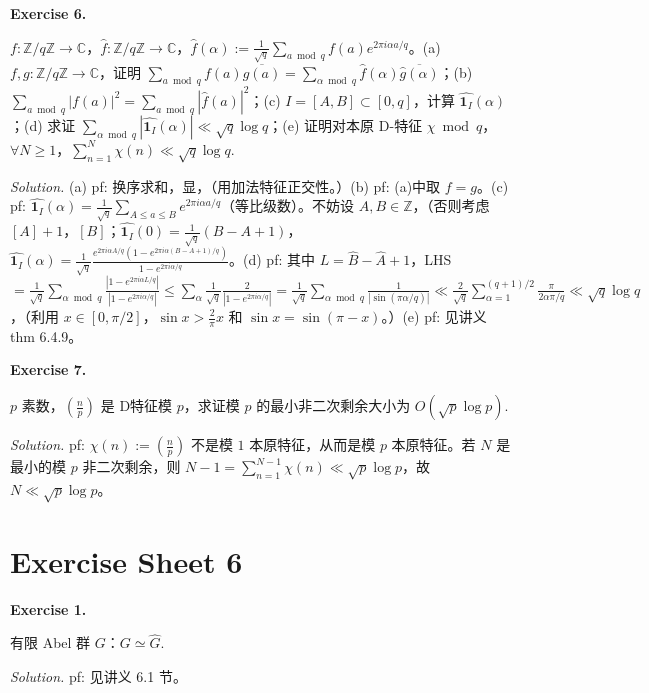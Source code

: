 \documentclass[
	colors = true,
	geometry = b5,
	fontsetup = font-setup-overleaf.tex,
	titlesetup = titles-setup.tex
]{AJbook}
\newenvironment{sheetexercise}[1]{%
	\par\medskip
	\noindent\textbf{Exercise #1.}\enspace
}{%
	\par\smallskip
}
\newenvironment{solution}{%
	\par\smallskip
	\noindent\textit{Solution.}\enspace
}{%
	\par\smallskip
}
\providecommand{\one}{\mathbf 1}
\begin{document}
\begin{sheetexercise}{6}
$f:\mathbb Z/q\mathbb Z\to\mathbb C$，$\widehat f:\mathbb Z/q\mathbb Z\to\mathbb C$，$\widehat f(\alpha):=\frac1{\sqrt q}\sum_{a\bmod q}f(a)e^{2\pi i\alpha a/q}$。(a) $f,g:\mathbb Z/q\mathbb Z\to\mathbb C$，证明 $\sum_{a\bmod q}f(a)\overline{g(a)}=\sum_{\alpha\bmod q}\widehat f(\alpha)\overline{\widehat g(\alpha)}$；(b) $\sum_{a\bmod q}|f(a)|^2=\sum_{a\bmod q}|\widehat f(a)|^2$；(c) $I=[A,B]\subset[0,q]$，计算 $\widehat{\one_I}(\alpha)$；(d) 求证 $\sum_{\alpha\bmod q}|\widehat{\one_I}(\alpha)|\ll\sqrt q\log q$；(e) 证明对本原 D-特征 $\chi\bmod q$，$\forall N\geq1$，$\sum_{n=1}^N\chi(n)\ll\sqrt q\log q$.
\end{sheetexercise}
\begin{solution}(a) pf: 换序求和，显，（用加法特征正交性。）(b) pf: (a)中取 $f=g$。(c) pf: $\widehat{\one_I}(\alpha)=\frac1{\sqrt q}\sum_{A\leq a\leq B}e^{2\pi i\alpha a/q}$（等比级数）。不妨设 $A,B\in\mathbb Z$，（否则考虑 $[A]+1$，$[B]$；$\widehat{\one_I}(0)=\frac1{\sqrt q}(B-A+1)$，$\widehat{\one_I}(\alpha)=\frac1{\sqrt q}\frac{e^{2\pi i\alpha A/q}(1-e^{2\pi i\alpha(B-A+1)/q})}{1-e^{2\pi i\alpha/q}}$。(d) pf: 其中 $L=\widehat B-\widehat A+1$，LHS$=\frac1{\sqrt q}\sum_{\alpha\bmod q}\frac{|1-e^{2\pi i\alpha L/q}|}{|1-e^{2\pi i\alpha/q}|}\leq\sum_\alpha\frac1{\sqrt q}\frac2{|1-e^{2\pi i\alpha/q}|}=\frac1{\sqrt q}\sum_{\alpha\bmod q}\frac1{|\sin(\pi\alpha/q)|}\ll\frac2{\sqrt q}\sum_{\alpha=1}^{(q+1)/2}\frac{\pi}{2\alpha\pi/q}\ll\sqrt q\log q$，（利用 $x\in[0,\pi/2]$，$\sin x>\frac2\pi x$ 和 $\sin x=\sin(\pi-x)$。）(e) pf: 见讲义 thm 6.4.9。\end{solution}

\begin{sheetexercise}{7}
$p$ 素数，$(\frac np)$ 是 D特征模 $p$，求证模 $p$ 的最小非二次剩余大小为 $O(\sqrt p\log p)$.
\end{sheetexercise}
\begin{solution}pf: $\chi(n):=(\frac np)$ 不是模 $1$ 本原特征，从而是模 $p$ 本原特征。若 $N$ 是最小的模 $p$ 非二次剩余，则 $N-1=\sum_{n=1}^{N-1}\chi(n)\ll\sqrt p\log p$，故 $N\ll\sqrt p\log p$。\end{solution}
\chapter{Exercise Sheet 6}
\begin{sheetexercise}{1}
有限 Abel 群 $G$：$G\simeq \widehat{G}$.
\end{sheetexercise}
\begin{solution}pf: 见讲义 6.1 节。\end{solution}
\end{document}
